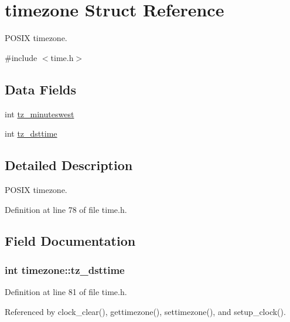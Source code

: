 \hypertarget{structtimezone}{}\section{timezone Struct Reference}
\label{structtimezone}


P\+O\+S\+IX timezone.  




{\ttfamily \#include $<$time.\+h$>$}

\subsection*{Data Fields}
\begin{DoxyCompactItemize}
\item 
int \hyperlink{structtimezone_a3042f7eff6e1b980728def76b1fa0eb7}{tz\+\_\+minuteswest}
\item 
int \hyperlink{structtimezone_a85259977aeb63b17e6ce94f19afdfd99}{tz\+\_\+dsttime}
\end{DoxyCompactItemize}


\subsection{Detailed Description}
P\+O\+S\+IX timezone. 

Definition at line 78 of file time.\+h.



\subsection{Field Documentation}
\subsubsection[{\texorpdfstring{tz\+\_\+dsttime}{tz_dsttime}}]{\setlength{\rightskip}{0pt plus 5cm}int timezone\+::tz\+\_\+dsttime}\hypertarget{structtimezone_a85259977aeb63b17e6ce94f19afdfd99}{}\label{structtimezone_a85259977aeb63b17e6ce94f19afdfd99}


Definition at line 81 of file time.\+h.



Referenced by clock\+\_\+clear(), gettimezone(), settimezone(), and setup\+\_\+clock().

